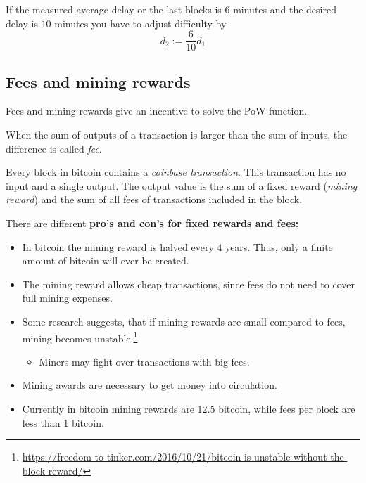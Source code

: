 \begin{example}
	If the measured average delay or the last blocks is $6$ minutes and the desired delay is $10$ minutes you have to adjust difficulty by
	\[
		d_2 := \frac{6}{10}d_1
	\]
	
\end{example}



\subsection{Fees and mining rewards}
Fees and mining rewards give an incentive to solve the PoW function.

\begin{definition}
When the sum of outputs of a transaction is larger than the sum of inputs, the difference is called \emph{fee}.	
\end{definition}

\begin{definition}
Every block in bitcoin contains a \emph{coinbase transaction}. This transaction has no input and a single output. The output value is the sum of a fixed reward (\emph{mining reward}) and the sum of all fees of transactions included in the block.
\end{definition}

\begin{note} There are different \textbf{pro's and con's for fixed rewards and fees:}
	\begin{itemize}
		\item In bitcoin the mining reward is halved every 4 years. Thus, only a finite amount of bitcoin will ever be created.
		\item The mining reward allows cheap transactions, since fees do not need to cover full mining expenses.
		\item Some research suggests, that if mining rewards are small compared to fees, mining becomes unstable.\footnote{\url{https://freedom-to-tinker.com/2016/10/21/bitcoin-is-unstable-without-the-block-reward/}}
		\begin{itemize}
			\item Miners may fight over transactions with big fees.
		\end{itemize}
		\item Mining awards are necessary to get money into circulation.
		\item Currently in bitcoin mining rewards are 12.5 bitcoin, while fees per block are less than 1 bitcoin.
	\end{itemize}
\end{note}

